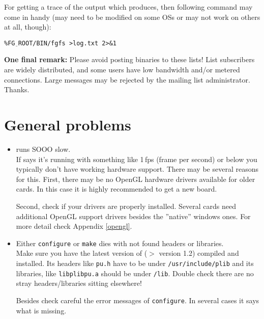 For getting a trace of the output which \FlightGear{} produces, then following command may come in handy (may need to be modified on some OSs or may not work on others at all, though):
\medskip

\texttt{\%FG$\underline{~~}$ROOT/BIN/fgfs >log.txt 2>\&1}
\medskip

\textbf{One final remark:} Please avoid posting binaries to these lists! List subscribers are widely distributed, and some users have low bandwidth and/or metered connections. Large messages may be rejected by the mailing list administrator. Thanks.

\section{General problems}
\begin{itemize}

\item{\FlightGear{} runs SOOO slow.}\\
 If \FlightGear{} says it's running with something like 1\,fps
 (frame per second) or below you typically don't have working hardware
  support. There may be several reasons for this. First,
 there may be no OpenGL hardware drivers available for older
 cards. In this case it is highly recommended to get a new board.

 Second, check if your drivers are properly installed. Several
 cards need additional OpenGL support drivers besides the
 ''native'' windows ones. For more detail check Appendix
 \ref{opengl}.

\item{Either \texttt{configure} or \texttt{make} dies with not found \PLIB{} headers or
 libraries.}\\
  Make sure you have the latest version of \PLIB{} ($>$ version 1.2) compiled and installed.
  Its headers like \texttt{pu.h} have to be under \texttt{/usr/include/plib} and its libraries, like \texttt{libplibpu.a} should be under \texttt{/lib}. Double check there are no stray \PLIB{} headers/libraries sitting elsewhere!

  Besides check careful the error messages of \texttt{configure}. In several cases it
  says what is missing.
 \end{itemize}

